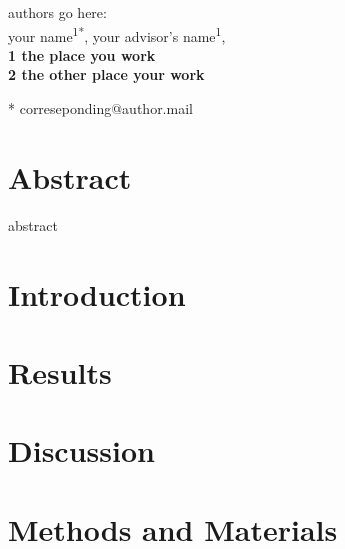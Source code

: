 \documentclass[10pt,letterpaper]{article}
\begin{document}
\vspace*{0.35in}

\begin{flushleft}
{\Large
\textbf{}
\newline
authors go here:
\\
your name\textsuperscript{1*},
your advisor's name\textsuperscript{1},
\\
\bigskip
\bf{1} the place you work
\\
\bf{2} the other place your work

\bigskip
* correseponding@author.mail
}
\end{flushleft}

\section*{Abstract}
abstract 

\linenumbers

\section{Introduction}
\section{Results}
\section{Discussion}
\section{Methods and Materials}


\nolinenumbers



\end{document}
